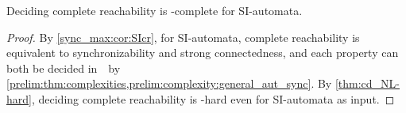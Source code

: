 \begin{theorem}\label{sync_max:thm:SI-aut_compl_reach_NL-c}
	Deciding complete reachability is \NL-complete
	for SI-automata.
\end{theorem}
\begin{proof}
	By \cref{sync_max:cor:SIcr}, for SI-automata,
	complete reachability is equivalent
	to synchronizability and strong connectedness,
	and each property can both be decided in~\NL\ by \cref{prelim:thm:complexities,prelim:complexity:general_aut_sync}.
	By \cref{thm:cd_NL-hard}, deciding complete reachability
	is \NL-hard even for SI-automata as input.
\end{proof}